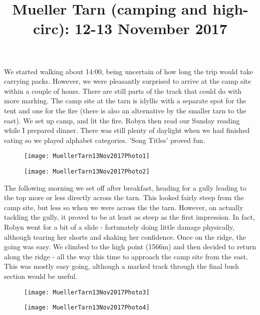 \documentclass[12pt]{article} %
\title{Mueller Tarn (camping and high-circ): 12-13 November 2017}
\makeatletter
\renewcommand{\maketitle}{%
  {\bfseries{\scshape{\Large{\@title\par}}}}
}
\makeatother
\begin{document}
  \maketitle
We started walking about 14:00, being uncertain of how long the trip would take carrying packs.  However, we were pleasantly surprised to arrive at the camp site within a couple of hours.  There are still parts of the track that could do with more marking.  The camp site at the tarn is idyllic with a separate spot for the tent and one for the fire (there is also an alternative by the smaller tarn to the east).  We set up camp, and lit the fire.  Robyn then read our Sunday reading while I prepared dinner.  There was still plenty of daylight when we had finished eating so we played alphabet categories.  'Song Titles' proved fun.

\begin{figure}[ht]
\begin{minipage}{.5\linewidth}
\begin{flushleft}
   \texttt{[image: MuellerTarn13Nov2017Photo1]}
\end{flushleft}
\end{minipage}
\begin{minipage}{.5\linewidth}
\begin{flushright}
   \texttt{[image: MuellerTarn13Nov2017Photo2]}
\end{flushright}
\end{minipage}
\end{figure}

The following morning we set off after breakfast, heading for a gully leading to the top more or less directly across the tarn.  This looked fairly steep from the camp site, but less so when we were across the the tarn.  However, on actually tackling the gully, it proved to be at least as steep as the first impression.  In fact, Robyn went for a bit of a slide - fortunately doing little damage physically, although tearing her shorts and shaking her confidence.  Once on the ridge, the going was easy.  We climbed to the high point (1566m) and then decided to return along the ridge - all the way this time to approach the camp site from the east.  This was mostly easy going, although a marked track through the final bush section would be useful.

\begin{figure}[ht]
\begin{minipage}{.5\linewidth}
\begin{flushleft}
   \texttt{[image: MuellerTarn13Nov2017Photo3]}
\end{flushleft}
\end{minipage}
\begin{minipage}{.5\linewidth}
\begin{flushright}
   \texttt{[image: MuellerTarn13Nov2017Photo4]}
\end{flushright}
\end{minipage}
\end{figure}
\end{document}
